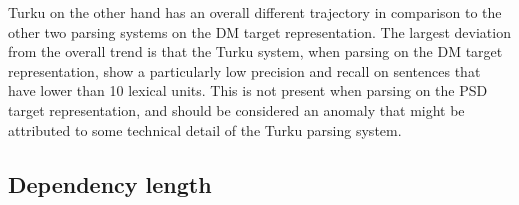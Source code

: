 Turku on the other hand has an overall different trajectory in comparison to the other two parsing systems on the DM target representation. The largest deviation from the overall trend is that the Turku system, when parsing on the DM target representation, show a particularly low precision and recall on sentences that have lower than 10 lexical units. This is not present when parsing on the PSD target representation, and should be considered an anomaly that might be attributed to some technical detail of the Turku parsing system.





\subsection{Dependency length}

